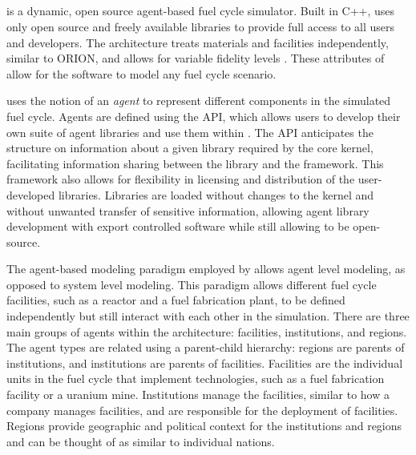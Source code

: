 \subsection{\Cyclus}
\Cyclus is a dynamic, open source agent-based fuel cycle simulator. Built 
in C++, \Cyclus uses only open source and freely available libraries to 
provide full access to all users and developers. The 
\Cyclus architecture treats materials and facilities independently, similar 
to ORION, and allows 
for variable fidelity levels \cite{huff_fundamental_2016}. These attributes
of \Cyclus allow for the software to model any fuel cycle scenario.

\Cyclus uses the notion of an \textit{agent} to represent different 
components in the simulated fuel cycle. Agents are 
defined using the \Cyclus \gls{API}, which allows users 
to develop their own suite of agent libraries and use them within \Cyclus. 
The \gls{API} anticipates the structure on information about a given 
library 
required by the core \Cyclus kernel, facilitating 
information sharing between the library and the \Cyclus framework. 
This framework 
also allows for flexibility in licensing and distribution of the 
user-developed libraries. Libraries are loaded without changes to the \Cyclus 
kernel and without unwanted transfer of sensitive information, allowing 
agent library development with export controlled 
software while still allowing \Cyclus to be open-source.

The agent-based modeling paradigm employed by \Cyclus allows agent level 
modeling, as opposed to system level modeling. This paradigm allows different 
fuel cycle facilities, such as a reactor and a fuel fabrication plant, to 
be defined independently but still interact with each other in the 
simulation. There are three main groups of agents within the \Cyclus 
architecture: facilities, institutions, and regions. The agent types
are related using a parent-child hierarchy: regions are
parents of institutions, and institutions are parents of facilities.
Facilities are 
the individual units in the fuel cycle that implement technologies, 
such as a fuel fabrication facility or a uranium mine. Institutions 
manage the facilities, similar to how a company manages facilities, 
and are responsible for the deployment of facilities. 
Regions provide geographic 
and political context for the institutions and regions and can be thought 
of as similar to individual nations. 

